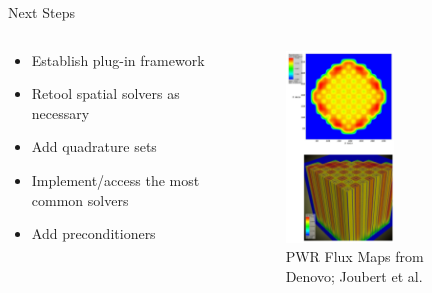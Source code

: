\documentclass[xcolor=x11names,compress]{beamer}
\renewcommand{\(}{\begin{columns}}
\renewcommand{\)}{\end{columns}}
\newcommand{\<}[1]{\begin{column}{#1}}
\renewcommand{\>}{\end{column}}
\begin{document}
\begin{frame}{Next Steps}

    \begin{columns}
    \begin{column}{0.5\textwidth}
        \begin{itemize}
        \item Establish plug-in framework
        \item Retool spatial solvers as necessary
        \item Add quadrature sets
        \item Implement/access the most common solvers
        \item Add preconditioners
        \end{itemize}
  	\end{column}
 	\begin{column}{0.4\textwidth}
        \begin{center}
 	    \begin{figure}
 	    \includegraphics[height=2in,clip]{../figs/PWR-maps}
 	    \caption{PWR Flux Maps from Denovo; Joubert et al.}
        \end{figure}
 	    \end{center}
  	\end{column}
	\end{columns}
    
\end{frame}

\end{document}
